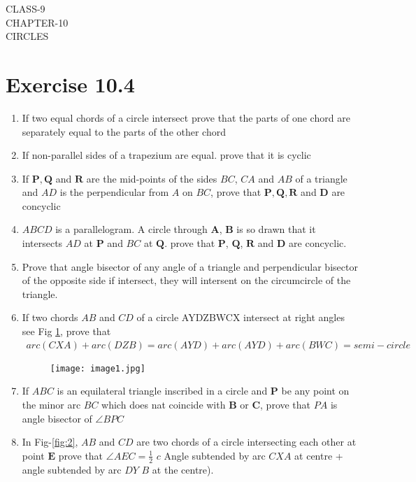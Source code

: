 \documentclass[12pt]{article}
\providecommand{\brak}[1]{\ensuremath{\left(#1\right)}}
\let\vec\mathbf
\begin{document}
\begin{center}
\textbf\large{CLASS-9\\CHAPTER-10 \\ CIRCLES}
\end{center}
\section*{Exercise 10.4}
\begin{enumerate}
\item If two equal chords of a circle intersect prove that the parts of one chord are separately equal to the parts of the other chord
\item If non-parallel sides of a trapezium are equal. prove that it is cyclic
\item If $\vec{P},\vec{Q}$ and $\vec{R}$ are the mid-points of the sides $BC$, $CA$ and $AB$ of a triangle and $AD$ is the perpendicular from $A$ on $BC$, prove that $\vec{P},\vec{Q},\vec{R}$ and $\vec{D}$ are concyclic
\item $ABCD$ is a parallelogram. A circle through $\vec{A}$, $\vec{B}$ is so drawn that it intersects $AD$ at $\vec{P}$ and $BC$ at $\vec{Q}$. prove that $\vec{P}$, $\vec{Q}$, $\vec{R}$ and $\vec{D}$ are concyclic.
\item Prove that angle bisector of any angle of a triangle and perpendicular bisector of the opposite side if intersect, they will intersent on the circumcircle of the triangle.
\item If two chords $AB$ and $CD$ of a circle AYDZBWCX intersect at right angles see Fig \ref{fig:1}, prove that
	\begin{align}
		arc\brak{CXA}+arc\brak{DZB}=arc\brak{AYD}+arc\brak{AYD}+arc\brak{BWC}= semi-circle
	\end{align}
	\begin{figure}[h!]                        \begin{center}                                   \texttt{[image: image1.jpg]}                          \end{center}                            \caption{}                                       \label{fig:1}                    \end{figure}
	\item If $ABC$ is an equilateral triangle inscribed in a circle and $\vec{P}$ be any point on the minor arc $BC$ which does nat coincide with $\vec{B}$ or $\vec{C}$, prove that $PA$ is angle bisector of $\angle BPC$
	\item In Fig-\ref{fig:2}, $AB$ and $CD$ are two chords of a circle intersecting each other at point $\vec{E}$ prove that $\angle AEC=\frac{1}{2}$ $c$ Angle subtended by arc $CXA$ at centre + angle subtended by arc $DY$ $B$ at the centre).

\end{enumerate}
\end{document}
